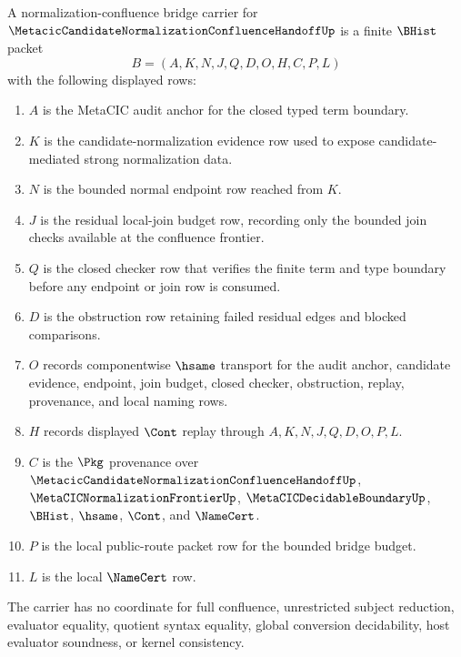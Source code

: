 \begin{definition}
\label{def:normalization-confluence-bridge-carrier}
A normalization-confluence bridge carrier for $\MetacicCandidateNormalizationConfluenceHandoffUp$ is a finite $\BHist$ packet
$$
B=(A,K,N,J,Q,D,O,H,C,P,L)
$$
with the following displayed rows:
\begin{enumerate}
\item $A$ is the MetaCIC audit anchor for the closed typed term boundary.
\item $K$ is the candidate-normalization evidence row used to expose candidate-mediated strong normalization data.
\item $N$ is the bounded normal endpoint row reached from $K$.
\item $J$ is the residual local-join budget row, recording only the bounded join checks available at the confluence frontier.
\item $Q$ is the closed checker row that verifies the finite term and type boundary before any endpoint or join row is consumed.
\item $D$ is the obstruction row retaining failed residual edges and blocked comparisons.
\item $O$ records componentwise $\hsame$ transport for the audit anchor, candidate evidence, endpoint, join budget, closed checker, obstruction, replay, provenance, and local naming rows.
\item $H$ records displayed $\Cont$ replay through $A,K,N,J,Q,D,O,P,L$.
\item $C$ is the $\Pkg$ provenance over $\MetacicCandidateNormalizationConfluenceHandoffUp$, $\MetaCICNormalizationFrontierUp$, $\MetaCICDecidableBoundaryUp$, $\BHist$, $\hsame$, $\Cont$, and $\NameCert$.
\item $P$ is the local public-route packet row for the bounded bridge budget.
\item $L$ is the local $\NameCert$ row.
\end{enumerate}
The carrier has no coordinate for full confluence, unrestricted subject reduction, evaluator equality, quotient syntax equality, global conversion decidability, host evaluator soundness, or kernel consistency.
\end{definition}

